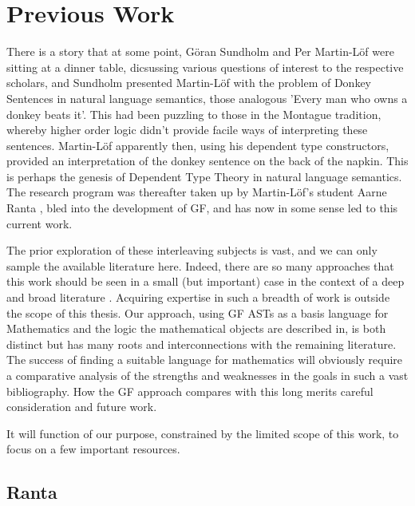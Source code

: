 \section{Previous Work}

There is a story that at some point, Göran Sundholm and Per Martin-Löf were
sitting at a dinner table, dicsussing various questions of interest to the
respective scholars, and Sundholm presented Martin-Löf with the problem of
Donkey Sentences in natural language semantics, those analogous 'Every man who
owns a donkey beats it'. This had been puzzling to those in the Montague
tradition, whereby higher order logic didn't provide facile ways of interpreting
these sentences. Martin-Löf apparently then, using his dependent type
constructors, provided an interpretation of the donkey sentence on the back of
the napkin. This is perhaps the genesis of Dependent Type Theory in natural
language semantics. The research program was thereafter taken up by Martin-Löf's
student Aarne Ranta \cite{ranta1994type}, bled into the development of GF, and
has now in some sense led to this current work.

The prior exploration of these interleaving subjects is vast, and we can only
sample the available literature here. Indeed, there are so many approaches that
this work should be seen in a small (but important) case in the context of a
deep and broad literature \cite{surveyLang}. Acquiring expertise in such a
breadth of work is outside the scope of this thesis. Our approach, using
GF ASTs as a basis language for Mathematics and the logic the mathematical
objects are described in, is both distinct but has many roots and
interconnections with the remaining literature. The success of finding a
suitable language for mathematics will obviously require a comparative analysis
of the strengths and weaknesses in the goals in such a vast bibliography. 
 How the GF approach compares with this long merits careful consideration and
 future work.

It will function of our purpose, constrained by the limited scope of this work,
to focus on a few important resources.

\subsection{Ranta}

